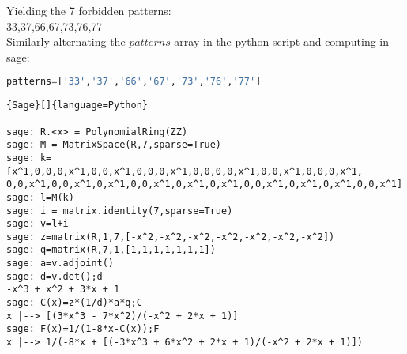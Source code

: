 \documentclass[12pt]{report}
\begin{document}
{{\begin{figure}[ht]
\begin{subfigure}[b]{0.1\textwidth}
\end{subfigure}\begin{subfigure}[b]{0.1\textwidth}
        	\centering


\end{subfigure}\begin{subfigure}[b]{0.1\textwidth}
        	\centering


\end{subfigure}
         
\end{figure}

\noindent Yielding the 7 forbidden patterns: \\

33,37,66,67,73,76,77 \\

\noindent Similarly alternating the $patterns$ array in the python script and computing in sage:
{
\begin{lstlisting}[language=Python]
patterns=['33','37','66','67','73','76','77']
\end{lstlisting}
}
{
\begin{lstlisting}{Sage}[]{language=Python}

sage: R.<x> = PolynomialRing(ZZ)
sage: M = MatrixSpace(R,7,sparse=True)
sage: k=[x^1,0,0,0,x^1,0,0,x^1,0,0,0,x^1,0,0,0,0,x^1,0,0,x^1,0,0,0,x^1,
0,0,x^1,0,0,x^1,0,x^1,0,0,x^1,0,x^1,0,x^1,0,0,x^1,0,x^1,0,x^1,0,0,x^1]
sage: l=M(k)
sage: i = matrix.identity(7,sparse=True)
sage: v=l+i
sage: z=matrix(R,1,7,[-x^2,-x^2,-x^2,-x^2,-x^2,-x^2,-x^2])
sage: q=matrix(R,7,1,[1,1,1,1,1,1,1])
sage: a=v.adjoint()
sage: d=v.det();d
-x^3 + x^2 + 3*x + 1
sage: C(x)=z*(1/d)*a*q;C
x |--> [(3*x^3 - 7*x^2)/(-x^2 + 2*x + 1)]
sage: F(x)=1/(1-8*x-C(x));F
x |--> 1/(-8*x + [(-3*x^3 + 6*x^2 + 2*x + 1)/(-x^2 + 2*x + 1)])


\end{lstlisting}}}}
\end{document}
